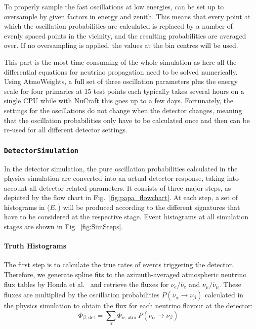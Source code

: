 
To properly sample the fast oscillations at low energies, \papa can be set up
to oversample by given factors in energy and zenith. This means that every
point at which the oscillation probabilities are calculated is replaced by a
number of evenly spaced points in the vicinity, and the resulting probabilities
are averaged over. If no oversampling is applied, the values at the bin
centres will be used.

This part is the most time-consuming of the whole simulation as here all the
differential equations for neutrino propagation need to be solved numerically.
Using AtmoWeights, a full set of three oscillation parameters plus the energy
scale for four primaries at 15 test points each typically takes several hours
on a single CPU while with NuCraft this goes up to a few days. Fortunately, the
settings for the oscillations do not change when the detector changes, meaning
that the oscillation probabilities only have to be calculated once and then can
be re-used for all different detector settings.


\subsubsection{\texttt{DetectorSimulation}}

In the detector simulation, the pure oscillation probabilities calculated in the
physics simulation are converted into an actual detector response, taking into
account all detector related parameters. It consists of three major steps, as
depicted by the flow chart in Fig.~\ref{fig:papa_flowchart}. At each step, a set
of histograms in ($E$,\,\coszen) will be produced according to the
different signatures that have to be considered at the respective stage. Event
histograms at all simulation stages are shown in Fig.~\ref{fig:SimSteps}.


\paragraph{Truth Histograms}

The first step is to calculate the true rates of events triggering the
detector. Therefore, we generate spline fits to the azimuth-averaged
atmospheric neutrino flux tables by Honda et al.\ \cite{Honda,
HondaSP} and retrieve the fluxes for
$\nu_e/\bar\nu_e$ and $\nu_\mu/\bar\nu_\mu$. These fluxes are multiplied by the
oscillation probabilities $P(\nu_\alpha \to \nu_\beta)$ calculated in the
physics simulation to obtain the flux for each neutrino flavour at the
detector:
\begin{equation}
 \Phi_{\beta,\,\mathrm{det}} =
   \sum_\alpha \Phi_{\alpha,\,\mathrm{atm}}\ P(\nu_\alpha\to\nu_\beta)
 \label{eqn:detetor_flux}
\end{equation}

